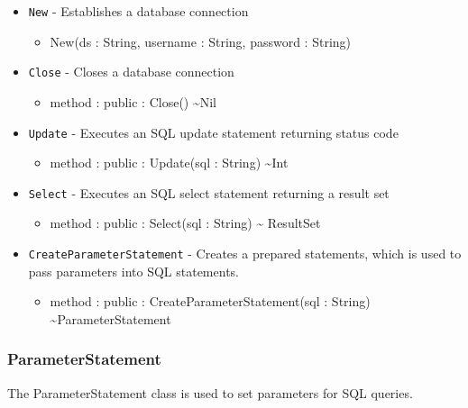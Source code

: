 \documentclass[11pt]{article}
\begin{document}
\begin{itemize}
\item \texttt{New} - Establishes a database connection
  \begin{itemize}
  \item New(ds : String, username : String, password : String)
  \end{itemize}
\item \texttt{Close} - Closes a database connection
  \begin{itemize}
  \item method : public : Close() \textasciitilde Nil
  \end{itemize}
\item \texttt{Update} - Executes an SQL update statement returning
  status code
  \begin{itemize}
  \item method : public : Update(sql : String) \textasciitilde Int
  \end{itemize}
\item \texttt{Select} - Executes an SQL select statement returning a
  result set
  \begin{itemize}
  \item method : public : Select(sql : String) \textasciitilde
    ResultSet
  \end{itemize}
\item \texttt{CreateParameterStatement} - Creates a prepared
  statements, which is used to pass parameters into SQL statements.
  \begin{itemize}
  \item method : public : CreateParameterStatement(sql : String)
    \textasciitilde ParameterStatement
  \end{itemize}
\end{itemize}

\subsubsection{ParameterStatement}
The ParameterStatement class is used to set parameters for SQL
queries.
\end{document}
